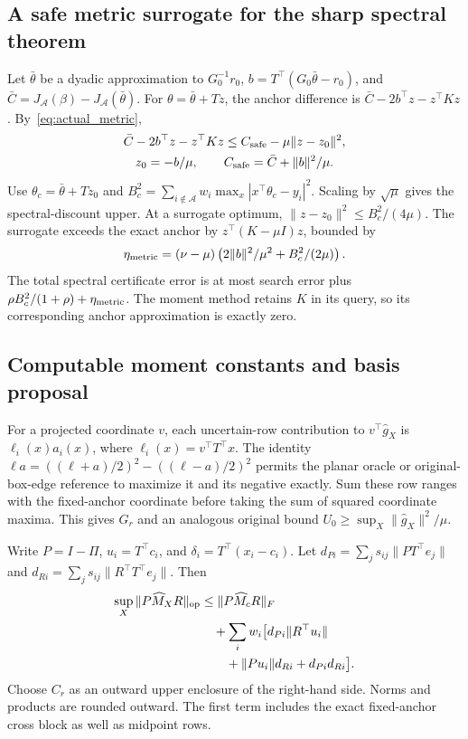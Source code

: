 \subsection{A safe metric surrogate for the sharp spectral theorem}
Let $\bar\theta$ be a dyadic approximation to $G_0^{-1}r_0$, $b=T^\top(G_0\bar\theta-r_0)$, and $\bar C=J_{\mathcal A}(\beta)-J_{\mathcal A}(\bar\theta)$. For $\theta=\bar\theta+Tz$, the anchor difference is $\bar C-2b^\top z-z^\top Kz$. By~\eqref{eq:actual_metric},
\[
 \begin{gathered}
 \bar C-2b^\top z-z^\top Kz\leq C_{\rm safe}-\mu\|z-z_0\|^2,\\
 z_0=-b/\mu,\qquad C_{\rm safe}=\bar C+\|b\|^2/\mu.
 \end{gathered}
\]
Use $\theta_c=\bar\theta+Tz_0$ and $B_c^2=\sum_{i\notin\mathcal A}w_i\max_x|x^\top\theta_c-y_i|^2$. Scaling by $\sqrt\mu$ gives the spectral-discount upper. At a surrogate optimum, $\|z-z_0\|^2\leq B_c^2/(4\mu)$. The surrogate exceeds the exact anchor by $z^\top(K-\mu I)z$, bounded by
\[
 \eta_{\rm metric}=(\nu-\mu)\left(2\|b\|^2/\mu^2+B_c^2/(2\mu)\right).
\]
The total spectral certificate error is at most search error plus $\rho B_c^2/(1+\rho)+\eta_{\rm metric}$. The moment method retains $K$ in its query, so its corresponding anchor approximation is exactly zero.

\subsection{Computable moment constants and basis proposal}
For a projected coordinate $v$, each uncertain-row contribution to $v^\top\widehat g_X$ is $\ell_i(x)a_i(x)$, where $\ell_i(x)=v^\top T^\top x$. The identity $\ell a=((\ell+a)/2)^2-((\ell-a)/2)^2$ permits the planar oracle or original-box-edge reference to maximize it and its negative exactly. Sum these row ranges with the fixed-anchor coordinate before taking the sum of squared coordinate maxima. This gives $G_r$ and an analogous original bound $U_0\geq\sup_X\|\widehat g_X\|^2/\mu$.

Write $P=I-\Pi$, $u_i=T^\top c_i$, and $\delta_i=T^\top(x_i-c_i)$. Let $d_{Pi}=\sum_j s_{ij}\|PT^\top e_j\|$ and $d_{Ri}=\sum_j s_{ij}\|R^\top T^\top e_j\|$. Then
\[
 \begin{aligned}
 \sup_X\|P\widehat M_XR\|_{\mathrm{op}}&\leq\|P\widehat M_cR\|_F\\
 &\quad+\sum_iw_i\bigl[d_{Pi}\|R^\top u_i\|\\
 &\qquad+\|Pu_i\|d_{Ri}+d_{Pi}d_{Ri}\bigr].
 \end{aligned}
\]
Choose $C_r$ as an outward upper enclosure of the right-hand side. Norms and products are rounded outward. The first term includes the exact fixed-anchor cross block as well as midpoint rows.

